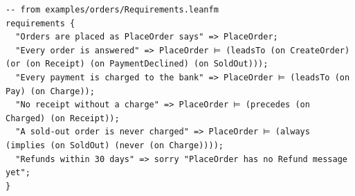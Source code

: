 \begin{lstlisting}[language={},basicstyle=\ttfamily\footnotesize,breaklines=true]
-- from examples/orders/Requirements.leanfm
requirements {
  "Orders are placed as PlaceOrder says" => PlaceOrder;
  "Every order is answered" => PlaceOrder ⊨ (leadsTo (on CreateOrder) (or (on Receipt) (on PaymentDeclined) (on SoldOut)));
  "Every payment is charged to the bank" => PlaceOrder ⊨ (leadsTo (on Pay) (on Charge));
  "No receipt without a charge" => PlaceOrder ⊨ (precedes (on Charged) (on Receipt));
  "A sold-out order is never charged" => PlaceOrder ⊨ (always (implies (on SoldOut) (never (on Charge))));
  "Refunds within 30 days" => sorry "PlaceOrder has no Refund message yet";
}
\end{lstlisting}
